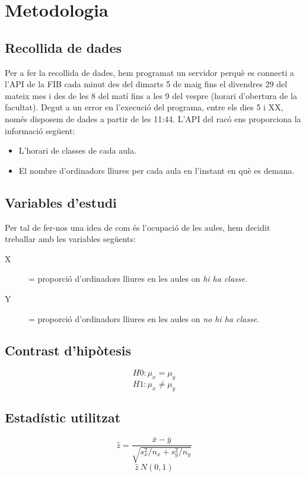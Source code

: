 \section{Metodologia}

\subsection{Recollida de dades}
Per a fer la recollida de dades, hem programat un servidor perquè es connecti a l'API de la FIB cada minut des del dimarts 5 de maig fins el divendres 29 del mateix mes i des de les 8 del matí fins a les 9 del vespre (horari d'obertura de la facultat). Degut a un error en l'execució del programa, entre els dies 5 i XX, només disposem de dades a partir de les  11:44.
L'API del racó ens proporciona la informació següent:
\begin{itemize}
	\item L'horari de classes de cada aula.
	\item El nombre d'ordinadors lliures per cada aula en l'instant en què es demana.
\end{itemize}

\subsection{Variables d'estudi}
Per tal de fer-nos una idea de com és l'ocupació de les aules, hem decidit treballar amb les variables següents:
\begin{description}
	\item[X] = proporció d'ordinadors lliures en les aules on \emph{hi ha classe}.
	\item[Y] = proporció d'ordinadors lliures en les aules on \emph{no hi ha classe}.
\end{description}

 
\subsection{Contrast d'hipòtesis}
$$H0: \mu_x = \mu_y$$
$$H1: \mu_x \neq \mu_y$$

\subsection{Estadístic utilitzat}
$$\hat{z} = \frac{\bar{x} - \bar{y}}{\sqrt{s_x^2/n_x + s_y^2/n_y}} $$
$$\hat{z} ~ N(0,1)$$


